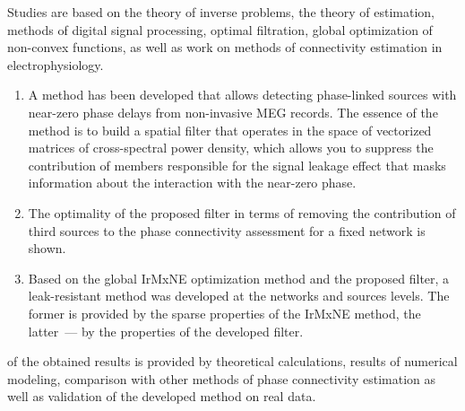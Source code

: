{\methods}
Studies are based on the theory of inverse problems, the theory of estimation,
methods of digital signal processing, optimal filtration, global optimization
of non-convex functions, as well as work on methods of connectivity estimation
in electrophysiology.

{}
\begin{enumerate}
  \item A method has been developed that allows detecting phase-linked sources with near-zero phase delays from non-invasive MEG records. The essence of the method is to build a spatial filter that operates in the space of vectorized matrices of cross-spectral power density, which allows you to suppress the contribution of members responsible for the signal leakage effect that masks information about the interaction with the near-zero phase.
  \item The optimality of the proposed filter in terms of removing the contribution of third sources to the phase connectivity assessment for a fixed network is shown.
  \item Based on the global IrMxNE optimization method and the proposed filter, a leak-resistant method was developed at the networks and sources levels. The former is provided by the sparse properties of the IrMxNE method, the latter~--- by the properties of the developed filter.
\end{enumerate}

{\reliability} of the obtained results is provided by theoretical
calculations, results of numerical modeling, comparison with other methods of
phase connectivity estimation as well as validation of the developed method on
real data.

{\probation}


